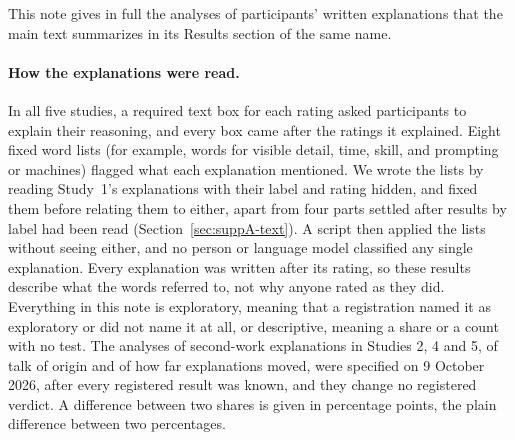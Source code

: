 
This note gives in full the analyses of participants' written explanations that the main text summarizes in its Results section of the same name.

\paragraph*{How the explanations were read.}
In all five studies, a required text box for each rating asked participants to explain their reasoning, and every box came after the ratings it explained. Eight fixed word lists (for example, words for visible detail, time, skill, and prompting or machines) flagged what each explanation mentioned. We wrote the lists by reading Study~1's explanations with their label and rating hidden, and fixed them before relating them to either, apart from four parts settled after results by label had been read (Section~\ref{sec:suppA-text}). A script then applied the lists without seeing either, and no person or language model classified any single explanation. Every explanation was written after its rating, so these results describe what the words referred to, not why anyone rated as they did. Everything in this note is exploratory, meaning that a registration named it as exploratory or did not name it at all, or descriptive, meaning a share or a count with no test. The analyses of second-work explanations in Studies 2, 4 and 5, of talk of origin and of how far explanations moved, were specified on 9 October 2026, after every registered result was known, and they change no registered verdict. A difference between two shares is given in percentage points, the plain difference between two percentages.

